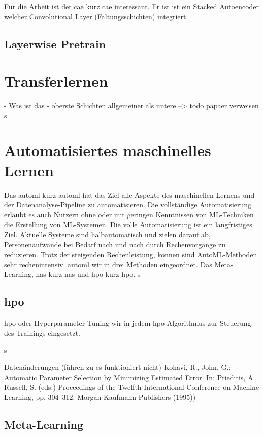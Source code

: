 	Für die Arbeit ist der \acl{cae} \cite{Masci.2011} kurz \ac{cae} interessant. Er ist ist ein Stacked Autoencoder welcher Convolutional Layer (Faltungsschichten) \cite{LeCun.1999} integriert.  

		\subsection{Layerwise Pretrain }

	\cite{Bengio.2007}

	\section{ Transferlernen}
	\label{sec:Transferlernen}
		- Was ist das
		-	oberste Schichten allgemeiner als untere --> todo papaer verweisen
		s
	\section{Automatisiertes maschinelles Lernen}
	\label{sec:AutoML}
	 Das \acl{automl} kurz \ac{automl} hat das Ziel alle Aspekte des maschinellen Lernens und der Datenanalyse-Pipeline zu automatisieren. Die vollständige Automatisierung erlaubt es auch Nutzern ohne oder mit geringen Kenntnissen von ML-Techniken die Erstellung von ML-Systemen. 
	Die volle Automatisierung ist ein langfristiges Ziel. Aktuelle Systeme sind halbautomatisch und zielen darauf ab, Personenaufwände bei Bedarf nach und nach durch Rechenvorgänge zu reduzieren. Trotz der steigenden Rechenleistung, können sind AutoML-Methoden sehr rechenintensiv.  \ac{automl} wir in drei Methoden eingeordnet. Das Meta-Learning, \acl{nas} kurz \ac{nas} und \acl{hpo} kurz \ac{hpo}. \cite{Hutter.2019} 
	s
	\subsection{\acl{hpo}}	
	\acl{hpo} oder Hyperparameter-Tuning wir in jedem \ac{hpo}-Algorithmus zur Steuerung des Trainings eingesetzt. 
	
	\cite{Kohavi.}s
	
	\cite{Feurer.2019}		
	
		Datenänderungen (führen zu es funktioniert nicht)
	Kohavi, R., John, G.: Automatic Parameter Selection by Minimizing Estimated Error. In:
	Prieditis, A., Russell, S. (eds.) Proceedings of the Twelfth International Conference on
	Machine Learning, pp. 304–312. Morgan Kaufmann Publishers (1995))
	
	\subsection{Meta-Learning}
		\cite{JoaquinVanschoren.2018}
		\cite{Vanschoren.2019}
